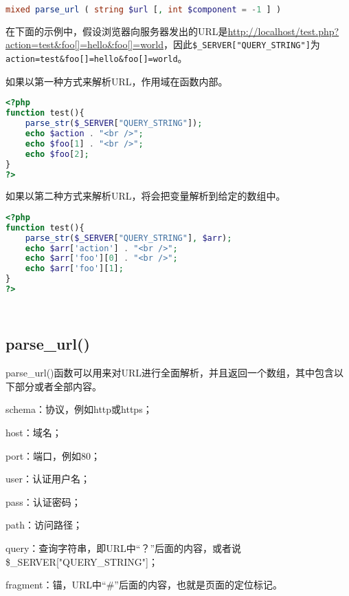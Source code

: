 \begin{lstlisting}[language=PHP]
mixed parse_url ( string $url [, int $component = -1 ] )
\end{lstlisting}

在下面的示例中，假设浏览器向服务器发出的URL是\url{http://localhost/test.php?action=test\&foo[]=hello\&foo[]=world}，因此\texttt{\$\_SERVER["QUERY\_STRING"]}为\texttt{action=test\&foo[]=hello\&foo[]=world}。


如果以第一种方式来解析URL，作用域在函数内部。

\begin{lstlisting}[language=PHP]
<?php
function test(){
	parse_str($_SERVER["QUERY_STRING"]);
	echo $action . "<br />";
	echo $foo[1] . "<br />";
	echo $foo[2];
}
?>
\end{lstlisting}

如果以第二种方式来解析URL，将会把变量解析到给定的数组中。

\begin{lstlisting}[language=PHP]
<?php
function test(){
	parse_str($_SERVER["QUERY_STRING"], $arr);
	echo $arr['action'] . "<br />";
	echo $arr['foo'][0] . "<br />";
	echo $arr['foo'][1];
}
?>
\end{lstlisting}




\begin{lstlisting}[language=PHP]

\end{lstlisting}



\begin{lstlisting}[language=PHP]

\end{lstlisting}


\subsection{parse\_url()}

parse\_url()函数可以用来对URL进行全面解析，并且返回一个数组，其中包含以下部分或者全部内容。

\begin{compactitem}
\item schema：协议，例如http或https；
\item host：域名；
\item port：端口，例如80；
\item user：认证用户名；
\item pass：认证密码；
\item path：访问路径；
\item query：查询字符串，即URL中“？”后面的内容，或者说\$\_SERVER["QUERY\_STRING"]；
\item fragment：锚，URL中“\#”后面的内容，也就是页面的定位标记。
\end{compactitem}

